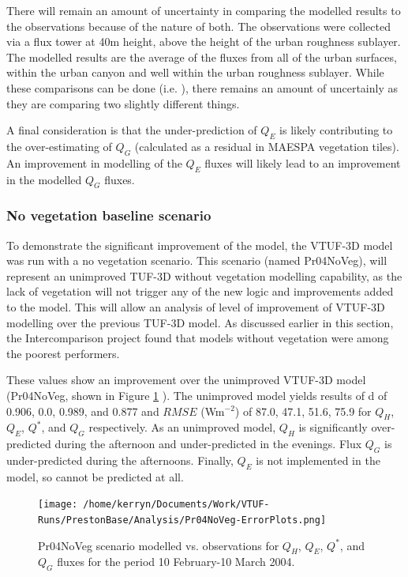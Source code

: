 \documentclass[final,3p,times,authoryear]{elsarticle}
\begin{document}
There will remain an amount of uncertainty in comparing the modelled results to the observations because of the nature of both. The observations were collected via a flux tower at 40m height, above the height of the urban roughness sublayer. The modelled results are the average of the fluxes from all of the urban surfaces, within the urban canyon and well within the urban roughness sublayer. While these comparisons can be done (i.e. \cite{Grimmond2011}), there remains an amount of uncertainly as they are comparing two slightly different things. 

A final consideration is that the under-prediction of $Q_{E}$ is likely contributing to the over-estimating of $Q_{G}$ (calculated as a residual in MAESPA vegetation tiles). An improvement in modelling of the $Q_{E}$ fluxes will likely lead to an improvement in the modelled $Q_{G}$ fluxes. 

\subsubsection{No vegetation baseline scenario}

To demonstrate the significant improvement of the model, the VTUF-3D model was run with a no vegetation scenario. This scenario (named Pr04NoVeg), will represent an unimproved TUF-3D without vegetation modelling capability, as the lack of vegetation will not trigger any of the new logic and improvements added to the model. This will allow an analysis of level of improvement of VTUF-3D modelling over the previous TUF-3D model. As discussed earlier in this section, the Intercomparison project found that models without vegetation were among the poorest performers.
 
These values show an improvement over the unimproved VTUF-3D model (Pr04NoVeg, shown in Figure \ref{fig:Prestonnovegerror} ). The unimproved model yields results of d of 0.906, 0.0, 0.989, and 0.877 and $RMSE$ (Wm$^{-2}$) of 87.0, 47.1, 51.6, 75.9 for $Q_{H}$, $Q_{E}$, $Q^{*}$, and $Q_{G}$ respectively. As an unimproved model, $Q_{H}$ is significantly over-predicted during the afternoon and under-predicted in the evenings. Flux $Q_{G}$ is under-predicted during the afternoons. Finally, $Q_{E}$ is not implemented in the model, so cannot be predicted at all.




\begin{figure}[!htbp]
\texttt{[image: /home/kerryn/Documents/Work/VTUF-Runs/PrestonBase/Analysis/Pr04NoVeg-ErrorPlots.png]}
\caption{Pr04NoVeg scenario modelled vs. observations for $Q_{H}$, $Q_{E}$, $Q^{*}$, and $Q_{G}$ fluxes for the period 10 February-10 March 2004. \label{fig:Prestonnovegerror}}    
\end{figure}
\end{document}
